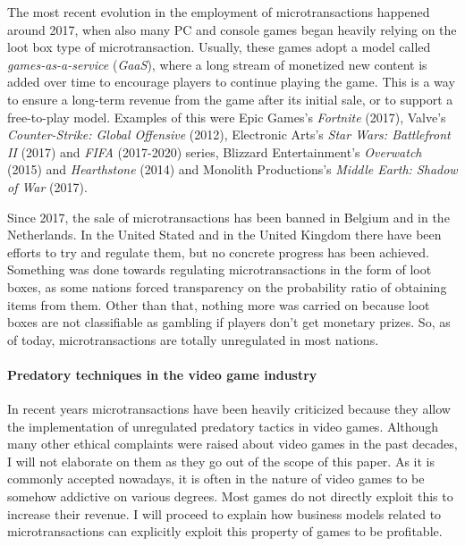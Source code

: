 \documentclass[10pt,a4paper]{article}
\begin{document}
The most recent evolution in the employment of microtransactions happened around 2017, when also many PC and console games began heavily relying on the loot box type of microtransaction. 
Usually, these games adopt a model called \textit{games-as-a-service} (\textit{GaaS}), where a long stream of monetized new content is added over time to encourage players to continue playing the game. 
This is a way to ensure a long-term revenue from the game after its initial sale, or to support a free-to-play model. 
Examples of this were Epic Games's \textit{Fortnite} (2017), Valve's \textit{Counter-Strike: Global Offensive} (2012), Electronic Arts's \textit{Star Wars: Battlefront II} (2017) and \textit{FIFA} (2017-2020) series, Blizzard Entertainment's \textit{Overwatch} (2015) and \textit{Hearthstone} (2014) and Monolith Productions's \textit{Middle Earth: Shadow of War} (2017).

Since 2017, the sale of microtransactions has been banned in Belgium and in the Netherlands. In the United Stated and in the United Kingdom there have been efforts to try and regulate them, but no concrete progress has been achieved.
Something was done towards regulating microtransactions in the form of loot boxes, as some nations forced transparency on the probability ratio of obtaining items from them. Other than that, nothing more was carried on because loot boxes are not classifiable as gambling if players don't get monetary prizes.
So, as of today, microtransactions are totally unregulated in most nations.
%
\paragraph{Predatory techniques in the video game industry}
In recent years microtransactions have been heavily criticized because they allow the implementation of unregulated predatory tactics in video games.
Although many other ethical complaints were raised about video games in the past decades, I will not elaborate on them as they go out of the scope of this paper.
As it is commonly accepted nowadays, it is often in the nature of video games to be somehow addictive on various degrees.
Most games do not directly exploit this to increase their revenue.
I will proceed to explain how business models related to microtransactions can explicitly exploit this property of games to be profitable.
\end{document}
